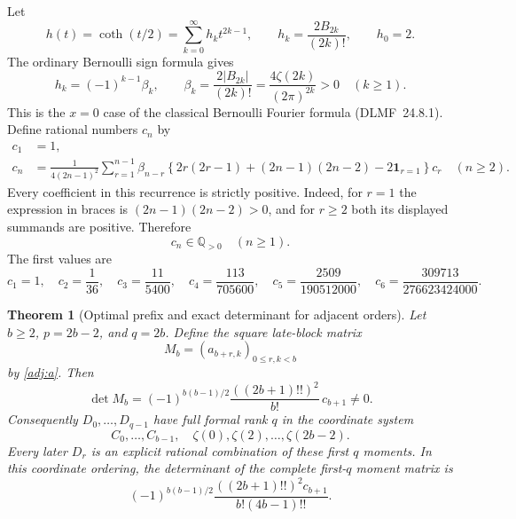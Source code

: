 \documentclass[11pt,a4paper]{article}
\numberwithin{equation}{section}
\newtheorem{theorem}{Theorem}[section]
\theoremstyle{definition}
\theoremstyle{remark}
\begin{document}
Let
\[
 h(t)=\coth(t/2)=\sum_{k=0}^{\infty}h_k t^{2k-1},\qquad
 h_k=\frac{2B_{2k}}{(2k)!},\qquad h_0=2.
\]
The ordinary Bernoulli sign formula gives
\begin{equation}\label{adj:hsign}
 h_k=(-1)^{k-1}\beta_k,\qquad
 \beta_k=\frac{2|B_{2k}|}{(2k)!}
 =\frac{4\zeta(2k)}{(2\pi)^{2k}}>0\quad(k\ge1).
\end{equation}
This is the $x=0$ case of the classical Bernoulli Fourier formula
(DLMF~24.8.1).  Define rational numbers $c_n$ by
\begin{align}
 c_1&=1,\label{adj:c1}\\
 c_n&=\frac{1}{4(2n-1)^2}
 \sum_{r=1}^{n-1}\beta_{n-r}
 \left\{2r(2r-1)+(2n-1)(2n-2)-2\mathbf1_{r=1}\right\}c_r
 \quad(n\ge2).
 \label{adj:positive-recurrence}
\end{align}
Every coefficient in this recurrence is strictly positive.  Indeed,
for $r=1$ the expression in braces is $(2n-1)(2n-2)>0$, and for
$r\ge2$ both its displayed summands are positive.  Therefore
\begin{equation}\label{adj:cpositive}
 c_n\in\mathbb Q_{>0}\quad(n\ge1).
\end{equation}
The first values are
\[
 c_1=1,\quad c_2=\frac1{36},\quad c_3=\frac{11}{5400},\quad
 c_4=\frac{113}{705600},\quad
 c_5=\frac{2509}{190512000},\quad
 c_6=\frac{309713}{276623424000}.
\]

\begin{theorem}[Optimal prefix and exact determinant for adjacent orders]
\label{adj:main}
Let $b\ge2$, $p=2b-2$, and $q=2b$.  Define the square late-block
matrix
\[
 M_b=(a_{b+r,k})_{0\le r,k<b}
\]
by \eqref{adj:a}.  Then
\begin{equation}\label{adj:determinant}
 \det M_b=
 (-1)^{b(b-1)/2}\frac{((2b+1)!!)^2}{b!}\,c_{b+1}\ne0.
\end{equation}
Consequently $D_0,\ldots,D_{q-1}$ have full formal rank $q$ in
the coordinate system
\[
 C_0,\ldots,C_{b-1},\quad\zeta(0),\zeta(2),\ldots,\zeta(2b-2).
\]
Every later $D_r$ is an explicit rational combination of these first
$q$ moments.  In this coordinate ordering, the determinant of the
complete first-$q$ moment matrix is
\begin{equation}\label{adj:full-determinant}
 (-1)^{b(b-1)/2}
 \frac{((2b+1)!!)^2c_{b+1}}{b!(4b-1)!!}.
\end{equation}
\end{theorem}
\end{document}

